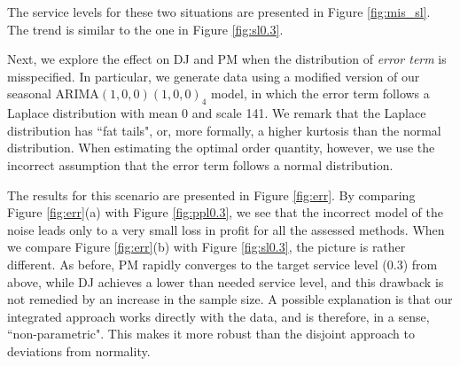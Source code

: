 \documentclass{article}
\begin{document}
The service levels for these two situations are presented in Figure \ref{fig:mis_sl}. The trend is similar to the one in Figure \ref{fig:sl0.3}.

Next, we explore the effect on DJ and PM when the distribution of \emph{error term} is misspecified. In particular, we generate data using a modified version of our seasonal ARIMA$(1,0,0)(1,0,0)_4$ model, in which the error term follows a Laplace distribution with mean 0 and scale 141. We remark that the Laplace distribution has ``fat tails", or, more formally, a higher kurtosis than the normal distribution. When estimating the optimal order quantity, however, we use the incorrect assumption that the error term follows a normal distribution.

The results for this scenario are presented in Figure \ref{fig:err}.
By comparing Figure \ref{fig:err}(a) with Figure \ref{fig:ppl0.3}, we see that the incorrect model of the noise leads only to a very small loss in profit for all the assessed methods. When we compare Figure \ref{fig:err}(b) with Figure \ref{fig:sl0.3}, the picture is rather different. As before, PM rapidly converges to the target service level (0.3) from above, while DJ achieves a lower than needed service level, and this drawback is not remedied by an increase in the sample size. A possible explanation is that our integrated approach works directly with the data, and is therefore, in a sense, ``non-parametric". This makes it more robust than the disjoint approach to deviations from normality.
\end{document}
